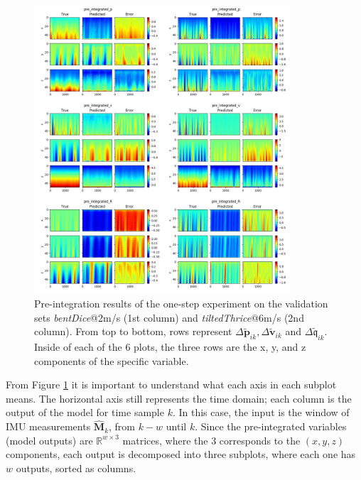 \begin{figure}[h]
   \centering
   \includegraphics[width=0.85\textwidth]{thesis_template/img/original_4_loss_bentDice_vs_tiltedThrice.jpg}
   \caption{Pre-integration results of the one-step experiment on the validation sets \emph{bentDice}@2m/s (1st column) and \emph{tiltedThrice}@6m/s (2nd column). From top to bottom, rows represent $\Delta\mathbf{\tilde{p}}_{ik}, \Delta\mathbf{\tilde{v}}_{ik}$ and $ \Delta\mathfrak{\tilde{q}}_{ik}$. Inside of each of the 6 plots, the three rows are the x, y, and z components of the specific variable.}
   \label{fig:pre_integration_original_4loss_bentDice_vs_tiltedThrice}
\end{figure}

From Figure \ref{fig:pre_integration_original_4loss_bentDice_vs_tiltedThrice} it is important to understand what each axis in each subplot means.
The horizontal axis still represents the time domain; each column is the output of the model for time sample $k$.
In this case, the input is the window of IMU measurements $\mathbf{\hat{M}}_k$, from $k-w$ until $k$.
Since the pre-integrated variables (model outputs) are $\mathbb{R}^{w\times 3}$ matrices, where the $3$ corresponds to the $(x, y, z)$ components, each output is decomposed into three subplots, where each one has $w$ outputs, sorted as columns.

